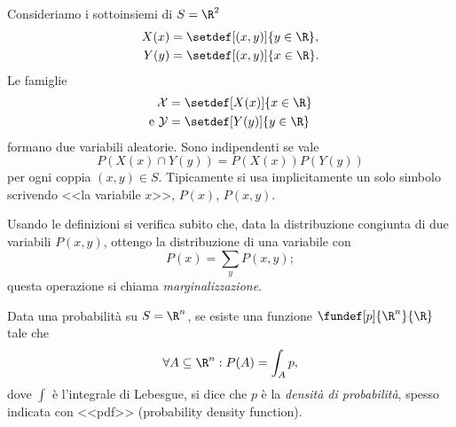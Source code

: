 \begin{es}
	Consideriamo i sottoinsiemi di $S=\R^2$
	\begin{align*}
		X(x) &= \setdef[(x,y)]{y\in\R}, \\
		Y(y) &= \setdef[(x,y)]{x\in\R}.
	\end{align*}
	Le famiglie
	\begin{align*}
		\mathcal X &= \setdef[X(x)]{x\in\R} \\
		\text{e }\mathcal Y &= \setdef[Y(y)]{y\in\R}
	\end{align*}
	formano due variabili aleatorie.
	Sono indipendenti se vale
	\begin{equation*}
		P(X(x) \cap Y(y)) = P(X(x))P(Y(y))
	\end{equation*}
	per ogni coppia $(x,y)\in S$.
	Tipicamente si usa implicitamente un solo simbolo scrivendo <<la variabile $x$>>, $P(x)$, $P(x,y)$.
\end{es}

\begin{defn}[Marginalizzazione]
	Usando le definizioni si verifica subito che, data la distribuzione congiunta di due variabili $P(x,y)$,
	ottengo la distribuzione di una variabile con
	\begin{equation*}
		P(x) = \sum_y P(x,y);
	\end{equation*}
	questa operazione si chiama \emph{marginalizzazione}.
\end{defn}

\begin{defn}
	Data una probabilità su $S=\R^n$, se esiste una funzione $\fundef[p]{\R^n}{\R}$ tale che
	\begin{equation*}
		\forall A\subseteq\R^n : P(A) = \int_A p,
	\end{equation*}
	dove $\int$ è l'integrale di Lebesgue,
	si dice che $p$ è la \emph{densità di probabilità},
	spesso indicata con <<pdf>> (probability density function).
\end{defn}

